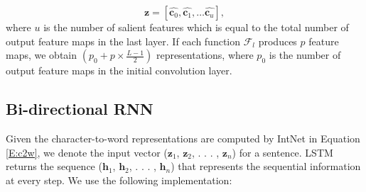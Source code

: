 \documentclass[11pt,a4paper]{article}
\begin{document}
\begin{equation}
\textbf{z} = [\hat{\textbf{c}_0}, \hat{\textbf{c}_1}, \dots \hat{\textbf{c}_u}],
\label{E:c2w}
\end{equation}
where $u$ is the number of salient features which is equal to the total number of output feature maps in the last layer. If each function $\mathcal{F}_{l}$ produces $p$ feature maps, we obtain $(p_0 + p \times \frac{L-1}{2})$ representations, where $p_0$ is the number of output feature maps in the initial convolution layer.

\subsection{Bi-directional RNN}

Given the character-to-word representations are computed by IntNet in Equation \ref{E:c2w}, we denote the input vector ($\textbf{z}_{1}$, $\textbf{z}_{2}$, . . . , $\textbf{z}_{n}$) for a sentence. LSTM \cite{hochreiter1997long} returns the sequence ($\textbf{h}_{1}$, $\textbf{h}_{2}$, . . . , $\textbf{h}_{n}$) that represents the sequential information at every step. We use the following implementation:
\end{document}
